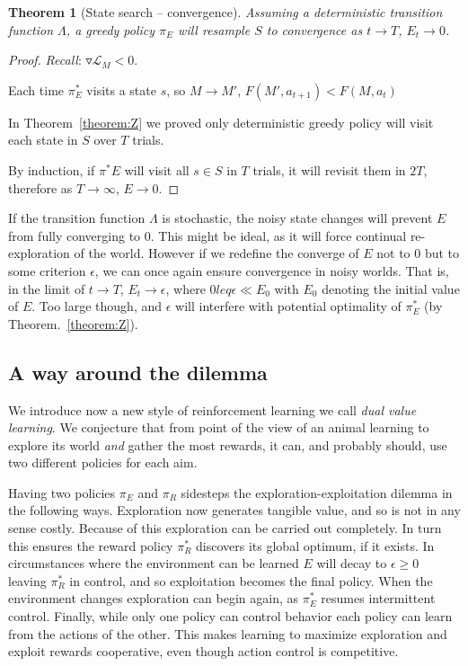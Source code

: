\documentclass[9pt,twocolumn,twoside]{pnas-new}
\newtheorem{theorem}{Theorem}
\begin{document}
\begin{theorem}[State search -- convergence] \label{theorem:convergence}
    Assuming a deterministic transition function $\Lambda$, a greedy policy $\pi_E$ will resample $S$ to convergence as $t \rightarrow T$, $E_t \rightarrow 0$.
\end{theorem}
\begin{proof}
    \textit{Recall}: $\triangledown \mathcal{L}_M < 0$. 

    Each time $\pi^*_E$ visits a state $s$, so $M \rightarrow M'$, $F(M', a_{t+1}) < F(M, a_t)$

    In Theorem~\ref{theorem:Z} we proved only deterministic greedy policy will visit each state in $S$ over $T$ trials.
    
    By induction, if $\pi^*E$ will visit all $s \in S$ in $T$ trials, it will revisit them in $2T$, therefore as $T \rightarrow \infty$, $E \rightarrow 0$. 
\end{proof}

If the transition function $\Lambda$ is stochastic, the noisy state changes will prevent $E$ from fully converging to 0. This might be ideal, as it will force continual re-exploration of the world. However if we redefine the converge of $E$ not to 0 but to some criterion $\epsilon$, we can once again ensure convergence in noisy worlds. That is, in the limit of $t \rightarrow T$, $E_t \rightarrow \epsilon$, where $0 leq \epsilon \ll E_0$ with $E_0$ denoting the initial value of $E$. Too large though, and $\epsilon$ will interfere with potential optimality of $\pi^*_E$ (by Theorem.~\ref{theorem:Z}). 

\subsection*{A way around the dilemma}
We introduce now a new style of reinforcement learning we call \textit{dual value learning}. We conjecture that from point of the view of an animal learning to explore its world \textit{and} gather the most rewards, it can, and probably should, use two different policies for each aim. 

Having two policies $\pi_E$ and $\pi_R$ sidesteps the exploration-exploitation dilemma in the following ways. Exploration now generates tangible value, and so is not in any sense costly. Because of this exploration can be carried out completely. In turn this ensures the reward policy $\pi^*_R$ discovers its global optimum, if it exists. In circumstances where the environment can be learned $E$ will decay to $\epsilon \geq 0$ leaving $\pi^*_R$ in control, and so exploitation becomes the final policy. When the environment changes exploration can begin again, as $\pi^*_E$ resumes intermittent control. Finally, while only one policy can control behavior each policy can learn from the actions of the other. This makes learning to maximize exploration and exploit rewards cooperative, even though action control is competitive. 
\end{document}
